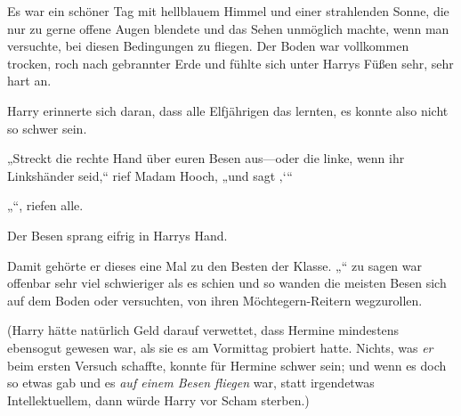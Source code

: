 Es war ein schöner Tag mit hellblauem Himmel und einer strahlenden Sonne, die nur zu gerne offene Augen blendete und das Sehen unmöglich machte, wenn man versuchte, bei diesen Bedingungen zu fliegen. Der Boden war vollkommen trocken, roch nach gebrannter Erde und fühlte sich unter Harrys Füßen sehr, sehr hart an.

Harry erinnerte sich daran, dass alle Elfjährigen das lernten, es konnte also nicht so schwer sein.

„Streckt die rechte Hand über euren Besen aus—oder die linke, wenn ihr Linkshänder seid,“ rief Madam Hooch, „und sagt ‚‘“

„“, riefen alle.

Der Besen sprang eifrig in Harrys Hand.

Damit gehörte er dieses eine Mal zu den Besten der Klasse. „“ zu sagen war offenbar sehr viel schwieriger als es schien und so wanden die meisten Besen sich auf dem Boden oder versuchten, von ihren Möchtegern-Reitern wegzurollen.

(Harry hätte natürlich Geld darauf verwettet, dass Hermine mindestens ebensogut gewesen war, als sie es am Vormittag probiert hatte. Nichts, was \emph{er} beim ersten Versuch schaffte, konnte für Hermine schwer sein; und wenn es doch so etwas gab und es \emph{auf einem Besen fliegen} war, statt irgendetwas Intellektuellem, dann würde Harry vor Scham sterben.)

